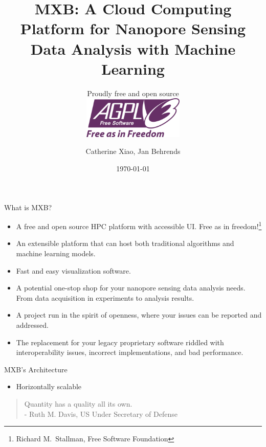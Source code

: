 \documentclass{beamer}
\title{MXB: A Cloud Computing Platform for Nanopore Sensing Data
Analysis with Machine Learning}
\subtitle{Proudly free and open source\\\vspace{2mm}
\centering\includegraphics[height=2cm]{assets/AGPL.png}}
\author{Catherine Xiao, Jan Behrends}
\institute{Institute of Physiology, University of Freiburg}
\date{\today}
\begin{document}
\begin{frame}
    \titlepage
\end{frame}

\begin{frame}{What is MXB?}
    \begin{itemize}
        \item A free and open source HPC platform with accessible UI. Free as in freedom!\footnote{Richard M.~Stallman, Free Software Foundation}\pause
        \item An extensible platform that can host both traditional algorithms and machine learning models.\pause
        \item Fast and easy visualization software.\pause
        \item A potential one-stop shop for your nanopore sensing data analysis needs. From data acquisition in experiments to analysis results.\pause
        \item A project run in the spirit of openness, where your issues can be reported and addressed.\pause
        \item The replacement for your legacy proprietary software riddled with interoperability issues, incorrect implementations, and bad performance.
    \end{itemize}
\end{frame}

\begin{frame}{MXB's Architecture}
    \begin{itemize}
        \item Horizontally scalable\pause
    \end{itemize}
    \begin{quotation}
        Quantity has a quality all its own.\\
        - Ruth M. Davis, US Under Secretary of Defense
    \end{quotation}
\end{frame}
\end{document}

